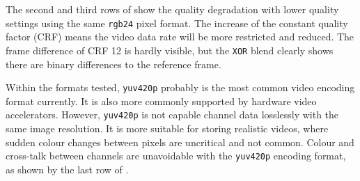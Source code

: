 The second and third rows of  show the quality degradation with lower quality settings using the same \texttt{rgb24} pixel format. The increase of the constant quality factor (CRF) means  the video data rate will be more restricted and reduced. The frame difference of CRF 12 is hardly visible, but the \texttt{XOR} blend clearly shows there are binary differences to the reference frame.

Within the  formats tested, \texttt{yuv420p} probably is the most common video encoding format currently. It is also more commonly supported by hardware video accelerators. However, \texttt{yuv420p} is not capable  channel data losslessly with the same image resolution. It is more suitable for storing realistic videos, where sudden colour changes between pixels are uncritical and not common. Colour  and cross-talk between channels are unavoidable with the \texttt{yuv420p} encoding format, as shown by the last row of .


